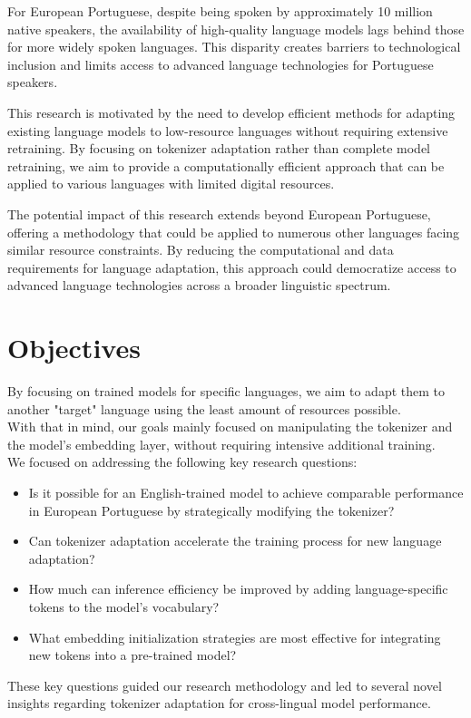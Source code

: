 For European Portuguese, despite being spoken by approximately 10 million native speakers, the availability of high-quality language models lags behind those for more widely spoken languages. This disparity creates barriers to technological inclusion and limits access to advanced language technologies for Portuguese speakers.

This research is motivated by the need to develop efficient methods for adapting existing language models to low-resource languages without requiring extensive retraining. By focusing on tokenizer adaptation rather than complete model retraining, we aim to provide a computationally efficient approach that can be applied to various languages with limited digital resources.

The potential impact of this research extends beyond European Portuguese, offering a methodology that could be applied to numerous other languages facing similar resource constraints. By reducing the computational and data requirements for language adaptation, this approach could democratize access to advanced language technologies across a broader linguistic spectrum.

\section{Objectives}\label{Section1.2}
By focusing on trained models for specific languages, we aim to adapt them to another "target" language using the least amount of resources possible.\\
With that in mind, our goals mainly focused on manipulating the tokenizer and the model's embedding layer, without requiring intensive additional training.\\

We focused on addressing the following key research questions:
\begin{itemize}
    \item Is it possible for an English-trained model to achieve comparable performance in European Portuguese by strategically modifying the tokenizer?
    \item Can tokenizer adaptation accelerate the training process for new language adaptation?
    \item How much can inference efficiency be improved by adding language-specific tokens to the model's vocabulary?
    \item What embedding initialization strategies are most effective for integrating new tokens into a pre-trained model?
\end{itemize}
These key questions guided our research methodology and led to several novel insights regarding tokenizer adaptation for cross-lingual model performance.


